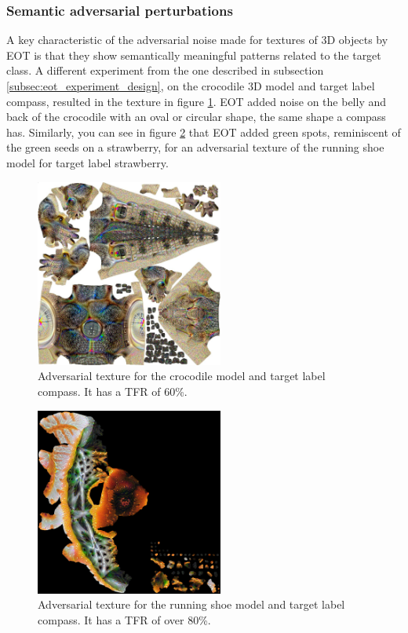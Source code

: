 \subsubsection{Semantic adversarial perturbations}

A key characteristic of the adversarial noise made for textures of 3D objects by EOT is that they show semantically meaningful patterns related to the target class. A different experiment from the one described in subsection \ref{subsec:eot_experiment_design}, on the crocodile 3D model and target label compass, resulted in the texture in figure \ref{fig:crocodile_compass}. EOT added noise on the belly and back of the crocodile with an oval or circular shape, the same shape a compass has. Similarly, you can see in figure \ref{fig:running_shoe_strawberry} that EOT added green spots, reminiscent of the green seeds on a strawberry, for an adversarial texture of the running shoe model for target label strawberry.

\begin{figure}[H]
    \centering
    \includegraphics[width=0.55\textwidth]{graphics/crocodile compass.jpg}
    \caption{Adversarial texture for the crocodile model and target label compass. It has a TFR of 60\%.}
    \label{fig:crocodile_compass}
\end{figure}

\begin{figure}[H]
    \centering
    \includegraphics[width=0.55\textwidth]{graphics/running shoe strawberry.jpg}
    \caption{Adversarial texture for the running shoe model and target label compass. It has a TFR of over 80\%.}
    \label{fig:running_shoe_strawberry}
\end{figure}

